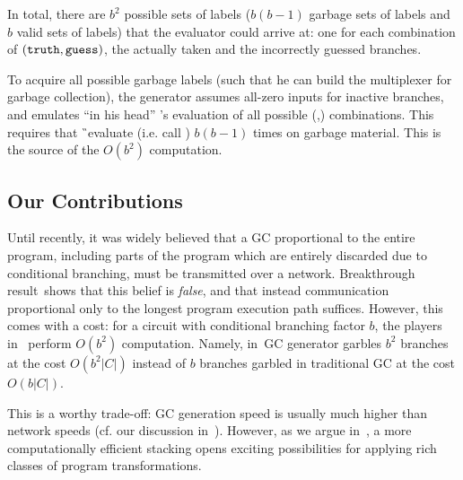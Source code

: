 In total, there are $b^2$ possible sets of labels ($b(b-1)$ garbage sets of labels and $b$ valid sets of labels)  that the evaluator
could arrive at: one for each combination of $(\mathtt{truth},\mathtt{guess})$, the  actually taken  and
the incorrectly guessed branches.
%


To acquire all possible garbage labels (such that he can build the multiplexer
for garbage collection), the \HK generator assumes all-zero inputs for
inactive branches, and emulates ``in his head'' \E's evaluation of all possible (\truth,\guess) combinations.
This requires that \G\ evaluate (i.e. call \Ev) $b(b-1)$ times on garbage material.
This is the source of the $O(b^2)$ computation.






\subsection{Our Contributions}
\label{sec:ourContrib}

Until recently, it was widely believed that a GC
proportional to the entire program, including parts of the program
which are entirely discarded due to conditional branching, must
be transmitted over a network.
Breakthrough result~\HK shows that this belief is \emph{false}, and that instead
communication proportional only to the longest program execution
path suffices.  However, this comes with a cost:
for a circuit with conditional branching factor $b$, the players in~\HK 
perform $O(b^2)$ computation.  Namely, in~\HK GC generator garbles $b^2$ branches at the cost $O(b^2|C|)$  instead of $b$ branches garbled in traditional GC at the cost $O(b|C|)$.

This is a worthy trade-off: GC generation speed is usually much higher than network speeds (cf. our discussion in~).  However, as we argue in~, 
a more computationally efficient stacking
opens exciting possibilities for applying rich classes of program transformations.   




